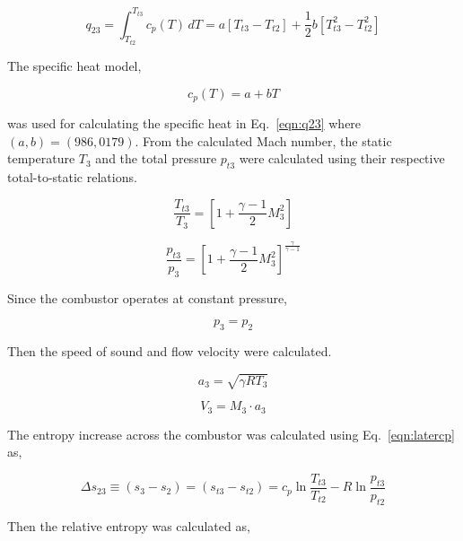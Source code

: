\documentclass[conf]{new-aiaa} %
\begin{document}
\begin{equation}
    \label{eqn:q23}
    q_{23}=\int_{T_{t2}}^{T_{t3}} c_p(T) \,dT=a\left[T_{t3}-T_{t2}\right]+\frac{1}{2}b\left[T_{t3}^2-T_{t2}^2\right]
\end{equation}

The specific heat model,

\begin{equation}
    \label{eqn:latercp}
    c_p (T)=a+bT
\end{equation}

was used for calculating the specific heat in Eq.~\eqref{eqn:q23} where $(a,b)=(986,0179)$. From the calculated Mach number, the static temperature $T_3$ and the total pressure $p_{t3}$ were calculated using their respective total-to-static relations.

\begin{equation}
    \label{eqn:T3}
    \frac{T_{t3}}{T_3}=\left[1+\frac{\gamma-1}{2}M_3^2\right]
\end{equation}

\begin{equation}
    \label{eqn:pt3}
    \frac{p_{t3}}{p_3}=\left[1+\frac{\gamma-1}{2}M_3^2\right]^\frac{\gamma}{\gamma-1}
\end{equation}

Since the combustor operates at constant pressure,

\begin{equation}
    \label{eqn:p3}
    p_3=p_2
\end{equation}

Then the speed of sound and flow velocity were calculated.

\begin{equation}
    \label{eqn:a3}
    a_3=\sqrt{\gamma RT_3}
\end{equation}

\begin{equation}
    \label{eqn:V3}
    V_3=M_3\cdot a_3
\end{equation}

The entropy increase across the combustor was calculated using Eq.~\eqref{eqn:latercp} as,

\begin{equation}
    \label{eqn:dels23}
    \Delta s_{23}\equiv\left(s_3-s_2\right)=\left(s_{t3}-s_{t2}\right)=c_p\ln\frac{T_{t3}}{T_{t2}}-R\ln\frac{p_{t3}}{p_{t2}}
\end{equation}

Then the relative entropy was calculated as,
\end{document}

